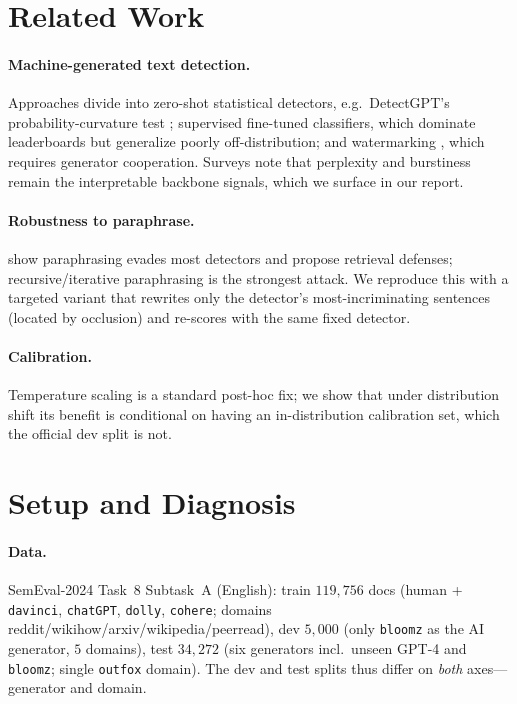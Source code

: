 \documentclass[11pt]{article}
\begin{document}
\section{Related Work}

\paragraph{Machine-generated text detection.} Approaches divide into
zero-shot statistical detectors, e.g.\ DetectGPT's probability-curvature test
\citep{mitchell2023detectgpt}; supervised fine-tuned classifiers, which
dominate leaderboards but generalize poorly off-distribution; and
watermarking \citep{kirchenbauer2023watermark}, which requires generator
cooperation. Surveys \citep{wu2025survey} note that perplexity and burstiness
remain the interpretable backbone signals, which we surface in our report.

\paragraph{Robustness to paraphrase.} \citet{krishna2023paraphrasing} show
paraphrasing evades most detectors and propose retrieval defenses;
recursive/iterative paraphrasing is the strongest attack. We reproduce this
with a targeted variant that rewrites only the detector's most-incriminating
sentences (located by occlusion) and re-scores with the same fixed detector.

\paragraph{Calibration.} Temperature scaling \citep{guo2017calibration} is a
standard post-hoc fix; we show that under distribution shift its benefit is
conditional on having an in-distribution calibration set, which the official
dev split is not.

\section{Setup and Diagnosis}
\label{sec:diag}

\paragraph{Data.} SemEval-2024 Task~8 Subtask~A (English): train $119{,}756$
docs (human + \texttt{davinci}, \texttt{chatGPT}, \texttt{dolly},
\texttt{cohere}; domains reddit/wikihow/arxiv/wikipedia/peerread), dev
$5{,}000$ (only \texttt{bloomz} as the AI generator, $5$ domains), test
$34{,}272$ (six generators incl.\ unseen GPT-4 and \texttt{bloomz}; single
\texttt{outfox} domain). The dev and test splits thus differ on \emph{both}
axes---generator and domain.
\end{document}
